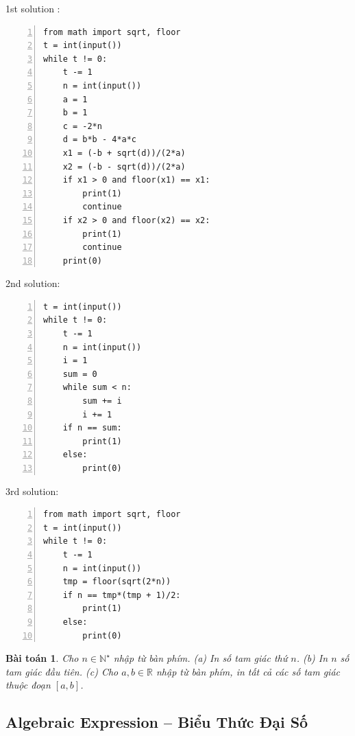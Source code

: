 \documentclass{article}
\newtheorem{baitoan}{Bài toán}
\begin{document}
1st solution \cite[6., pp. 204--205]{Duc_200_BT_Python}:
\begin{Verbatim}[numbers=left,xleftmargin=5mm]
from math import sqrt, floor
t = int(input())
while t != 0:
    t -= 1
    n = int(input())
    a = 1
    b = 1
    c = -2*n
    d = b*b - 4*a*c
    x1 = (-b + sqrt(d))/(2*a)
    x2 = (-b - sqrt(d))/(2*a)
    if x1 > 0 and floor(x1) == x1:
        print(1)
        continue
    if x2 > 0 and floor(x2) == x2:
        print(1)
        continue
    print(0)
\end{Verbatim}
\begin{multicols}{2}
2nd solution:
\begin{Verbatim}[numbers=left,xleftmargin=5mm]
t = int(input())
while t != 0:
    t -= 1
    n = int(input())
    i = 1
    sum = 0
    while sum < n:
        sum += i
        i += 1
    if n == sum:
        print(1)
    else:
        print(0)
\end{Verbatim}
\columnbreak
3rd solution:
\begin{Verbatim}[numbers=left,xleftmargin=5mm]
from math import sqrt, floor
t = int(input())
while t != 0:
    t -= 1
    n = int(input())
    tmp = floor(sqrt(2*n))
    if n == tmp*(tmp + 1)/2:
        print(1)
    else:
        print(0)
\end{Verbatim}
\end{multicols}

\begin{baitoan}
	Cho $n\in\mathbb{N}^\star$ nhập từ bàn phím. (a) In số tam giác thứ $n$. (b) In $n$ số tam giác đầu tiên. (c) Cho $a,b\in\mathbb{R}$ nhập từ bàn phím, in tất cả các số tam giác thuộc đoạn $[a,b]$.
\end{baitoan}



\subsection{Algebraic Expression -- Biểu Thức Đại Số}
\end{document}
